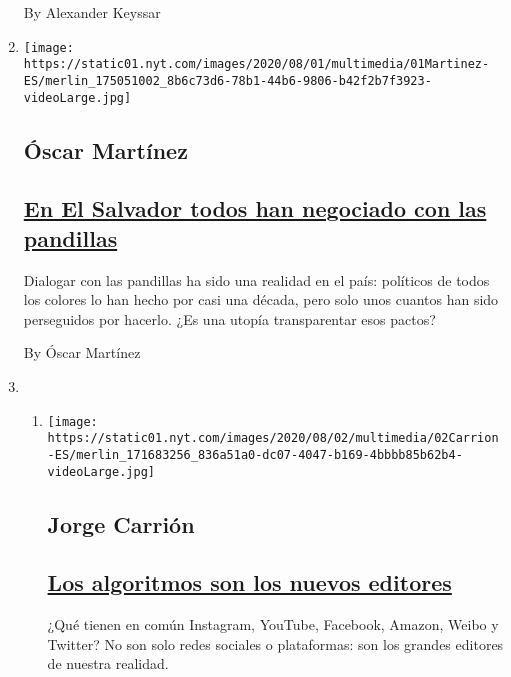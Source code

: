 \begin{enumerate}
  By Alexander Keyssar
\item
  \texttt{[image: https://static01.nyt.com/images/2020/08/01/multimedia/01Martinez-ES/merlin\_175051002\_8b6c73d6-78b1-44b6-9806-b42f2b7f3923-videoLarge.jpg]}

  \hypertarget{uxf3scar-martuxednez}{%
  \subsection{Óscar Martínez}\label{uxf3scar-martuxednez}}

  \hypertarget{en-el-salvador-todos-han-negociado-con-las-pandillas}{%
  \subsection{\texorpdfstring{\href{/es/2020/08/02/espanol/opinion/pandillas-el-salvador.html}{En
  El Salvador todos han negociado con las
  pandillas}}{En El Salvador todos han negociado con las pandillas}}\label{en-el-salvador-todos-han-negociado-con-las-pandillas}}

  Dialogar con las pandillas ha sido una realidad en el país: políticos
  de todos los colores lo han hecho por casi una década, pero solo unos
  cuantos han sido perseguidos por hacerlo. ¿Es una utopía transparentar
  esos pactos?

  By Óscar Martínez
\item
  \begin{enumerate}
  \def\labelenumii{\arabic{enumii}.}
  \item
    \texttt{[image: https://static01.nyt.com/images/2020/08/02/multimedia/02Carrion-ES/merlin\_171683256\_836a51a0-dc07-4047-b169-4bbbb85b62b4-videoLarge.jpg]}

    \hypertarget{jorge-carriuxf3n}{%
    \subsection{Jorge Carrión}\label{jorge-carriuxf3n}}

    \hypertarget{los-algoritmos-son-los-nuevos-editores}{%
    \subsection{\texorpdfstring{\href{/es/2020/08/02/espanol/opinion/facebook-amazon-instagram.html}{Los
    algoritmos son los nuevos
    editores}}{Los algoritmos son los nuevos editores}}\label{los-algoritmos-son-los-nuevos-editores}}

    ¿Qué tienen en común Instagram, YouTube, Facebook, Amazon, Weibo y
    Twitter? No son solo redes sociales o plataformas: son los grandes
    editores de nuestra realidad.


\end{enumerate}
\end{enumerate}
